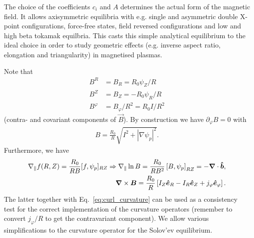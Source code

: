 The choice of the coefficients \(c_{i}\) and \(A\) determines the actual form of the magnetic field. It allows axisymmetric equilibria with e.g. single and asymmetric double X-point configurations, force-free states,
field reversed configurations and low and high beta tokamak equilbria. This casts this simple analytical equilibrium to the ideal choice in order to study geometric effects (e.g. inverse aspect ratio, elongation and triangularity) in magnetised plasmas.

Note that
\begin{align}
    B^R&=B_R = R_0\psi_Z/R \\
    B^Z&=B_Z = - R_0\psi_R/R \\
    B^\varphi &= B_\varphi/R^2 = R_0I/R^2
\end{align}
(contra- and covariant components of $\vec B$).
By construction we have $\partial_\varphi B = 0$ with
\begin{align}
  B = \frac{R_0}{R}\sqrt{ {I^2 + |\nabla \psi_p|^2}}.
    \label{}
\end{align}
Furthermore, we have
\begin{align}
  \nabla_\parallel f(R,Z) = \frac{R_0}{RB}[f,\psi_p]_{RZ}\Rightarrow \nabla_\parallel \ln B = \frac{R_0}{RB^2}\left[B, \psi_p\right]_{RZ} = -{\boldsymbol{\nabla}}\cdot\bm{\hat{b}},\\
    {\boldsymbol{\nabla}}\times {\boldsymbol{B}} = \frac{R_0}{R}\left[ I_Z \bm{\hat{e}}_R - I_R\bm{\hat{e}}_Z + j_\varphi\bm{\hat{e}}_\varphi  \right].
    \label{}
\end{align}
The latter together with Eq.~\eqref{eq:curl_curvature}
can be used as a consistency test for the correct implementation of the
curvature operators (remember to convert $j_\varphi/R$ to get the contravariant component).
We allow various simplifications to the curvature operator
for the Solov'ev equilibrium.


